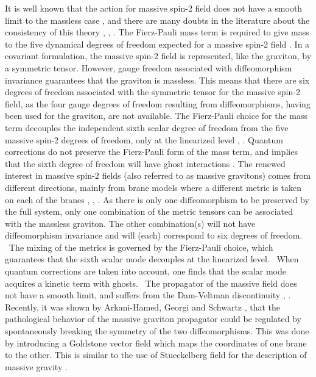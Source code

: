 \documentclass[a4paper,12pt]{article}
\begin{document}
It is well known that the action for massive spin-2 field does not have a
smooth limit to the massless case \cite{vv}, \cite{za} and there are many
doubts in the literature about the consistency of this theory \cite{bd},
\cite{dps}, \cite{nw}. The Fierz-Pauli mass term is required to give mass to
the five dynamical degrees of freedom expected for a massive spin-2 field
\cite{fp} . In a covariant formulation, the massive spin-2 field is
represented, like the graviton, by a symmetric tensor. However, gauge freedom
associated with diffeomorphism invariance guarantees that the graviton is
massless. This means that there are six degrees of freedom associated with the
symmetric tensor for the massive spin-2 field, as the four gauge degrees of
freedom resulting from diffeomorphisms, having been used for the graviton, are
not available. The Fierz-Pauli choice for the mass term decouples the
independent sixth scalar degree of freedom from the five massive spin-2
degrees of freedom, only at the linearized level \cite{bd}, \cite{dk}. Quantum
corrections do not preserve the Fierz-Pauli form of the mass term, and implies
that the sixth degree of freedom will have ghost interactions \cite{ss}. The
renewed interest in massive spin-2 fields (also referred to as massive
gravitons) comes from different directions, mainly from brane models where a
different metric is taken on each of the branes \cite{kmprs}, \cite{grs},
\cite{kr}. As there is only one diffeomorphism to be preserved by the full
system, only one combination of the metric tensors can be associated with the
massless graviton. The other combination(s) will not have diffeomorphism
invariance and will (each) correspond to six degrees of freedom. \ The mixing
of the metrics is governed by the Fierz-Pauli choice, which guarantees that
the sixth scalar mode decouples at the linearized level. \ When quantum
corrections are taken into account, one finds that the scalar mode acquires a
kinetic term with ghosts. \ The propagator of the massive field does not have
a smooth \coordHE{} limit, and suffers from the Dam-Veltman
discontinuity \cite{vv}, \cite{za}. Recently, it was shown by Arkani-Hamed,
Georgi and Schwartz \cite{ags}, that the pathological behavior of the massive
graviton propagator could be regulated by spontaneously breaking the symmetry
of the two diffeomorphisms. This was done by introducing a Goldstone vector
field which maps the coordinates of one brane to the other. This is similar to
the use of Stueckelberg field for the description of massive gravity
\cite{siegel}.
\end{document}
